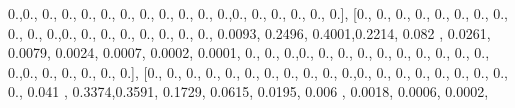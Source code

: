 \documentclass[
]{book}
\newenvironment{Shaded}{\begin{snugshade}}{\end{snugshade}}
\newcommand{\FloatTok}[1]{\textcolor[rgb]{0.00,0.00,0.81}{#1}}
\newcommand{\NormalTok}[1]{#1}
\begin{document}
\begin{Shaded}
\begin{Highlighting}[]
\FloatTok{0.}\NormalTok{,}\FloatTok{0.}\NormalTok{, }\FloatTok{0.}\NormalTok{, }\FloatTok{0.}\NormalTok{, }\FloatTok{0.}\NormalTok{, }\FloatTok{0.}\NormalTok{, }\FloatTok{0.}\NormalTok{, }\FloatTok{0.}\NormalTok{, }\FloatTok{0.}\NormalTok{, }\FloatTok{0.}\NormalTok{, }\FloatTok{0.}\NormalTok{, }\FloatTok{0.}\NormalTok{,}\FloatTok{0.}\NormalTok{, }\FloatTok{0.}\NormalTok{, }\FloatTok{0.}\NormalTok{, }\FloatTok{0.}\NormalTok{, }\FloatTok{0.}\NormalTok{, }\FloatTok{0.}\NormalTok{], [}\FloatTok{0.}\NormalTok{, }\FloatTok{0.}\NormalTok{,}
\FloatTok{0.}\NormalTok{, }\FloatTok{0.}\NormalTok{, }\FloatTok{0.}\NormalTok{, }\FloatTok{0.}\NormalTok{, }\FloatTok{0.}\NormalTok{, }\FloatTok{0.}\NormalTok{, }\FloatTok{0.}\NormalTok{, }\FloatTok{0.}\NormalTok{, }\FloatTok{0.}\NormalTok{,}\FloatTok{0.}\NormalTok{, }\FloatTok{0.}\NormalTok{, }\FloatTok{0.}\NormalTok{, }\FloatTok{0.}\NormalTok{, }\FloatTok{0.}\NormalTok{, }\FloatTok{0.}\NormalTok{, }\FloatTok{0.}\NormalTok{, }\FloatTok{0.}\NormalTok{, }\FloatTok{0.0093}\NormalTok{,}
\FloatTok{0.2496}\NormalTok{, }\FloatTok{0.4001}\NormalTok{,}\FloatTok{0.2214}\NormalTok{, }\FloatTok{0.082}\NormalTok{ , }\FloatTok{0.0261}\NormalTok{, }\FloatTok{0.0079}\NormalTok{, }\FloatTok{0.0024}\NormalTok{, }\FloatTok{0.0007}\NormalTok{, }\FloatTok{0.0002}\NormalTok{, }\FloatTok{0.0001}\NormalTok{,}
\FloatTok{0.}\NormalTok{, }\FloatTok{0.}\NormalTok{, }\FloatTok{0.}\NormalTok{,}\FloatTok{0.}\NormalTok{, }\FloatTok{0.}\NormalTok{, }\FloatTok{0.}\NormalTok{, }\FloatTok{0.}\NormalTok{, }\FloatTok{0.}\NormalTok{, }\FloatTok{0.}\NormalTok{, }\FloatTok{0.}\NormalTok{, }\FloatTok{0.}\NormalTok{, }\FloatTok{0.}\NormalTok{, }\FloatTok{0.}\NormalTok{, }\FloatTok{0.}\NormalTok{,}\FloatTok{0.}\NormalTok{, }\FloatTok{0.}\NormalTok{, }\FloatTok{0.}\NormalTok{, }\FloatTok{0.}\NormalTok{, }\FloatTok{0.}\NormalTok{, }\FloatTok{0.}\NormalTok{],}
\NormalTok{[}\FloatTok{0.}\NormalTok{, }\FloatTok{0.}\NormalTok{, }\FloatTok{0.}\NormalTok{, }\FloatTok{0.}\NormalTok{, }\FloatTok{0.}\NormalTok{, }\FloatTok{0.}\NormalTok{, }\FloatTok{0.}\NormalTok{, }\FloatTok{0.}\NormalTok{, }\FloatTok{0.}\NormalTok{, }\FloatTok{0.}\NormalTok{, }\FloatTok{0.}\NormalTok{,}\FloatTok{0.}\NormalTok{, }\FloatTok{0.}\NormalTok{, }\FloatTok{0.}\NormalTok{, }\FloatTok{0.}\NormalTok{, }\FloatTok{0.}\NormalTok{, }\FloatTok{0.}\NormalTok{, }\FloatTok{0.}\NormalTok{, }\FloatTok{0.}\NormalTok{, }\FloatTok{0.}\NormalTok{,}
\FloatTok{0.041}\NormalTok{ , }\FloatTok{0.3374}\NormalTok{,}\FloatTok{0.3591}\NormalTok{, }\FloatTok{0.1729}\NormalTok{, }\FloatTok{0.0615}\NormalTok{, }\FloatTok{0.0195}\NormalTok{, }\FloatTok{0.006}\NormalTok{ , }\FloatTok{0.0018}\NormalTok{, }\FloatTok{0.0006}\NormalTok{, }\FloatTok{0.0002}\NormalTok{,}

\end{Highlighting}
\end{Shaded}
\end{document}
